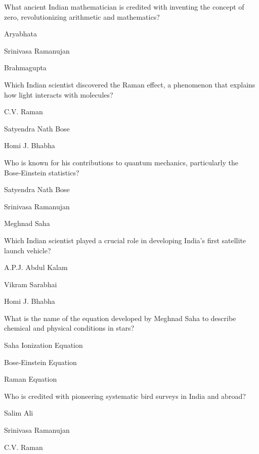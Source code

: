 
\begin{enhancedmcq}{What ancient Indian mathematician is credited with inventing the concept of zero, revolutionizing arithmetic and mathematics?}
\item Aryabhata
\item Srinivasa Ramanujan
\item Brahmagupta

\end{enhancedmcq}
\begin{enhancedmcq}{Which Indian scientist discovered the Raman effect, a phenomenon that explains how light interacts with molecules?}
\item C.V. Raman
\item Satyendra Nath Bose
\item Homi J. Bhabha

\end{enhancedmcq}
\begin{enhancedmcq}{Who is known for his contributions to quantum mechanics, particularly the Bose‑Einstein statistics?}
\item Satyendra Nath Bose
\item Srinivasa Ramanujan
\item Meghnad Saha

\end{enhancedmcq}
\begin{enhancedmcq}{Which Indian scientist played a crucial role in developing India's first satellite launch vehicle?}
\item A.P.J. Abdul Kalam
\item Vikram Sarabhai
\item Homi J. Bhabha

\end{enhancedmcq}
\begin{enhancedmcq}{What is the name of the equation developed by Meghnad Saha to describe chemical and physical conditions in stars?}
\item Saha Ionization Equation
\item Bose‑Einstein Equation
\item Raman Equation

\end{enhancedmcq}
\begin{enhancedmcq}{Who is credited with pioneering systematic bird surveys in India and abroad?}
\item Salim Ali
\item Srinivasa Ramanujan
\item C.V. Raman

\end{enhancedmcq}
